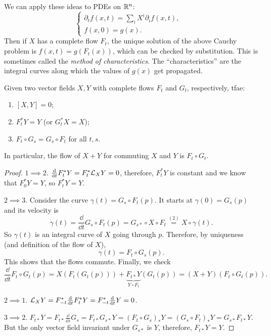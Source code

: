 \begin{rem}
    We can apply these ideas to PDEs on $\mathbb{R}^n$:
    \[\begin{cases}
        \partial_t f(x,t)=\sum _i X^i \partial_i f(x,t),&\\
        f(x,0)=g(x).&
    \end{cases}\]
    Then if $X$ has a complete flow $F_t$, the unique solution of the above Cauchy problem is $f(x,t)=g(F_t(x))$, which can be checked by substitution. This is sometimes called the \emph{method of characteristics}. The ``characteristics'' are the integral curves along which the values of $g(x)$ get propagated.
\end{rem}

\begin{prop}
    Given two vector fields $X,Y$ with complete flows $F_t$ and $G_t$, respectively, \gls{tfae}:
    \begin{enumerate}
        \item $[X,Y]=0$;
        \item $F^\ast_t Y=Y$ (or $G^\ast_t X=X$);
        \item $F_t\circ G_s=G_s\circ F_t$ for all $t,s$. 
    \end{enumerate}
    In particular, the flow of $X+Y$ for commuting $X$ and $Y$ is $F_t\circ G_t$.
\end{prop}
\begin{proof}
    $1\implies 2$. $\frac{{\mathrm{d}}}{{\mathrm{d}} t}F^\ast_t Y=F^\ast_t \mathcal{L}_X Y=0$, therefore, $F^\ast_t Y$ is constant and we know that $F^\ast_0 Y=Y$, so $F^\ast_t Y=Y$.

    $2\implies 3$. Consider the curve $\gamma(t)=G_s\circ F_t(p)$. It starts at $\gamma(0)=G_s(p)$ and its velocity is
    \[\dot\gamma(t)=\frac{\dd}{\dd t} G_s\circ F_t(p)=G_{s\ast}\circ X\circ F_t\overset{(2)}{=}X\circ\gamma(t).\]
    So $\gamma(t)$ is an integral curve of $X$ going through $p$. Therefore, by uniqueness (and definition of the flow of $X$), 
    \[\gamma(t)=F_t\circ G_s(p).\]
    This shows that the flows commute. Finally, we check 
    \[\frac{\dd}{\dd t} F_t\circ G_t(p)=X(F_t(G_t(p)))+\underbrace{F_{t\ast }Y}_{Y\circ F_t}(G_t(p))=(X+Y)(F_t\circ G_t(p)).\]

    $2\implies 1$. $\mathcal{L}_X Y=F^\ast_{-t}\frac{{\mathrm{d}}}{{\mathrm{d}} t}F^\ast_t Y=F^\ast_{-t} \frac{{\mathrm{d}}}{{\mathrm{d}} t}Y=0$.

    $3\implies 2$. $F_{t\ast}Y=F_{t\ast}\frac{\dd}{\dd s}G_s=F_{t\ast} G_{s\ast} Y=(F_t\circ G_s)_\ast Y=(G_s\circ F_t)_\ast Y=G_{s\ast}F_{t\ast}Y$. But the only vector field invariant under $G_{s\ast}$ is $Y$, therefore, $F_{t\ast}Y=Y$.
\end{proof}

